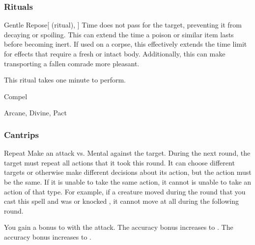 \subsubsection{Rituals}


\lowercase{\hypertarget{spell:Gentle Repose}{}}\label{spell:Gentle Repose}
\begin{attuneability}[Rank 3]{\hypertarget{spell:Gentle Repose}{Gentle Repose}}[ (ritual), ]
Time does not pass for the target, preventing it from decaying or spoiling.
This can extend the time a poison or similar item lasts before becoming inert.
If used on a corpse, this effectively extends the time limit for effects that require a fresh or intact body.
Additionally, this can make transporting a fallen comrade more pleasant.


This ritual takes one minute to perform.
\end{attuneability}
\vspace{0.25em}


\newpage
\begin{spellsection}{Compel}

\begin{spellheader}
\end{spellheader}


 Arcane, Divine, Pact

\subsubsection{Cantrips}


\begin{freeability}{Repeat}
Make an attack vs. Mental against the target.
\hit During the next round, the target must repeat all actions that it took this round.
It can choose different targets or otherwise make different decisions about its action, but the action must be the same.
If it is unable to take the same action, it cannot is unable to take an action of that type.
For example, if a creature moved during the round that you cast this spell and was  or knocked , it cannot move at all during the following round.

\rankline
{} You gain a  bonus to  with the attack.
 The accuracy bonus increases to .
 The accuracy bonus increases to .
\end{freeability}

\end{spellsection}


